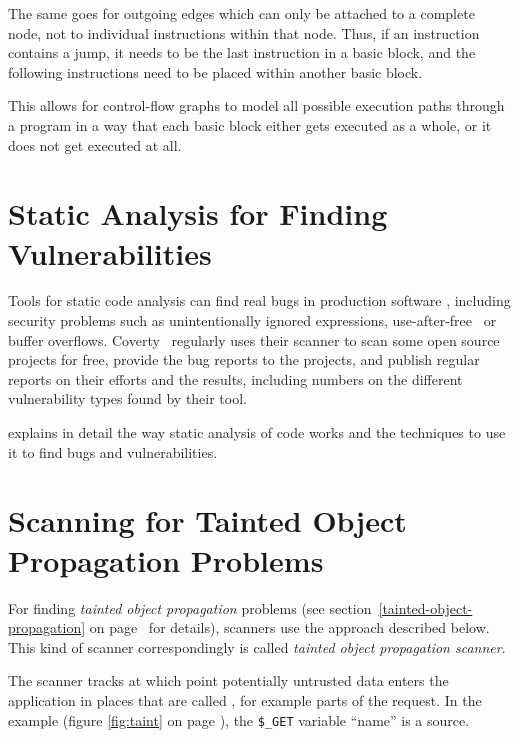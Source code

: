 The same goes for outgoing edges which can only be attached to a complete node, not to individual instructions within that node. Thus, if an instruction contains a jump, it needs to be the last instruction in a basic block, and the following instructions need to be placed within another basic block.

This allows for control-flow graphs to model all possible execution paths through a program in a way that each basic block either gets executed as a whole, or it does not get executed at all.



\section{Static Analysis for Finding Vulnerabilities}

Tools for static code analysis can find real bugs in production software \cite{findbugs, evaluating}, including security problems such as unintentionally ignored expressions, use-after-free~\cite{use-after-free-definition} or buffer overflows. Coverty~\cite{coverity-report} regularly uses their scanner to scan some open source projects for free, provide the bug reports to the projects, and publish regular reports on their efforts and the results, including numbers on the different vulnerability types found by their tool.

\cite{chess-west} explains in detail the way static analysis of code works and the techniques to use it to find bugs and vulnerabilities.



\section{Scanning for Tainted Object Propagation Problems}
\label{tainting}

For finding \emph{tainted object propagation} problems (see section~\ref{tainted-object-propagation} on page~\pageref{tainted-object-propagation} for details), scanners use the approach described below.~\cite{finding-security-vulnerabilities, chess-west} This kind of scanner correspondingly is called \emph{tainted object propagation scanner}.

The scanner tracks at which point potentially untrusted data enters the application in places that are called , for example parts of the request. In the example (figure \ref{fig:taint} on page \pageref{fig:taint}), the \texttt{\$\_GET} variable ``name'' is a source.

